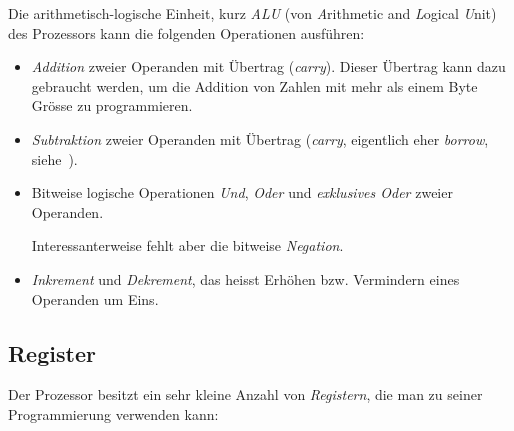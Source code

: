 \documentclass[11pt]{scrartcl}
\begin{document}
Die arithmetisch-logische Einheit, kurz \emph{ALU} (von
\emph{A}rithmetic and \emph{L}ogical \emph{U}nit) des Prozessors kann
die folgenden Operationen ausführen:

\begin{itemize}
\item \emph{Addition} zweier Operanden mit Übertrag
  (\emph{carry}). Dieser Übertrag kann dazu gebraucht werden, um die
  Addition von Zahlen mit mehr als einem Byte Grösse zu programmieren.
    
\item \emph{Subtraktion} zweier Operanden mit Übertrag (\emph{carry},
  eigentlich eher \emph{borrow}, siehe~\cite{kenshirriff6502overflow}).
\item Bitweise logische Operationen \emph{Und}, \emph{Oder} und
  \emph{exklusives Oder} zweier Operanden.
    
  Interessanterweise fehlt aber die bitweise \emph{Negation}.
\item \emph{Inkrement} und \emph{Dekrement}, das heisst Erhöhen
  bzw. Vermindern eines Operanden um Eins.
\end{itemize}

\subsection{Register}
\label{sec:register}


Der Prozessor besitzt ein sehr kleine Anzahl von
\emph{Registern}, die man zu seiner Programmierung verwenden kann:
\end{document}
